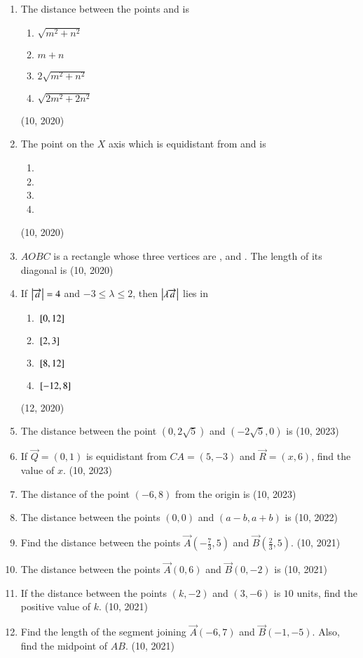 \begin{enumerate}[label=\thesubsection.\arabic*, ref=\thesubsection.\theenumi]
\item The distance between the points  and  is
\begin{enumerate}
\item \(\sqrt{m^{2} + n^{2}}\)
\item \(m + n\)
\item \(2\sqrt{m^{2} + n^{2}}\)
\item \(\sqrt{2m^{2} + 2n^{2}}\)
\end{enumerate}
\hfill (10, 2020)

\item The point on the $X$ axis which is equidistant from  and  is
\begin{enumerate}
\item {}
\item {}
\item {}
\item {}
\end{enumerate}
\hfill (10, 2020)
%
\item \(AOBC\) is a rectangle whose three vertices are ,  and . The length of its diagonal is
\hfill (10, 2020)
\item If $\begin{vmatrix}\overrightarrow{a}\end{vmatrix}= 4$ and $-3 \leq \lambda \leq 2$, then $\begin{vmatrix}\lambda \overrightarrow a\end{vmatrix}$ lies in
\begin{enumerate}
\item ${}\left[0,12\right]$
\item ${}\left[2,3\right]$
\item ${}\left[8,12\right]$
\item ${}\left[-12,8\right]$
\end{enumerate}
\hfill (12, 2020)
    \item The distance between the point $(0,2\sqrt{5})$ and $(-2\sqrt{5},0)$ is
    \hfill (10, 2023)
    \item If $\vec{Q} = (0,1)$ is equidistant from $CA = (5,-3)$ and $\vec{R} = (x,6)$, find the value of $x$.
    \hfill (10, 2023)
    \item The distance of the point $(-6,8)$ from the origin is
    \hfill (10, 2023)
    \item The distance between the points $(0,0)$ and $(a-b, a+b)$ is 
    \hfill (10, 2022)
	\item Find the distance between the points $\vec{A}\left(-\frac{7}{3}, 5\right)$ and $\vec{B}\left(\frac{2}{3}, 5\right)$. \hfill (10, 2021)
		\item The distance between the points $\vec{A}(0, 6)$ and $\vec{B}(0, -2)$ is
		\hfill (10, 2021)
		\item If the distance between the points $(k, -2)$ and $(3, -6)$ is $10$ units, find the positive value of $k$. \hfill (10, 2021)
		\item Find the length of the segment joining $\vec{A}(-6, 7)$ and $\vec{B}(-1, -5)$. Also, find the midpoint of $AB$. \hfill (10, 2021)
	

\end{enumerate}
